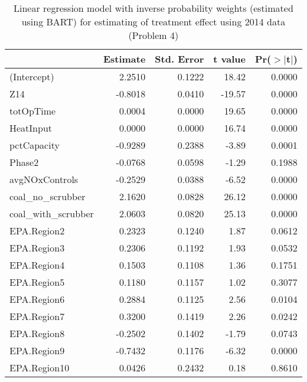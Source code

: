 \begin{table}[ht]
\centering
\begin{tabular}{lrrrr}
  \toprule
 & Estimate & Std. Error & t value & Pr($>$$|$t$|$) \\ 
  \midrule
(Intercept) & 2.2510 & 0.1222 & 18.42 & 0.0000 \\ 
  Z14 & -0.8018 & 0.0410 & -19.57 & 0.0000 \\ 
  totOpTime & 0.0004 & 0.0000 & 19.65 & 0.0000 \\ 
  HeatInput & 0.0000 & 0.0000 & 16.74 & 0.0000 \\ 
  pctCapacity & -0.9289 & 0.2388 & -3.89 & 0.0001 \\ 
  Phase2 & -0.0768 & 0.0598 & -1.29 & 0.1988 \\ 
  avgNOxControls & -0.2529 & 0.0388 & -6.52 & 0.0000 \\ 
  coal\_no\_scrubber & 2.1620 & 0.0828 & 26.12 & 0.0000 \\ 
  coal\_with\_scrubber & 2.0603 & 0.0820 & 25.13 & 0.0000 \\ 
  EPA.Region2 & 0.2323 & 0.1240 & 1.87 & 0.0612 \\ 
  EPA.Region3 & 0.2306 & 0.1192 & 1.93 & 0.0532 \\ 
  EPA.Region4 & 0.1503 & 0.1108 & 1.36 & 0.1751 \\ 
  EPA.Region5 & 0.1180 & 0.1157 & 1.02 & 0.3077 \\ 
  EPA.Region6 & 0.2884 & 0.1125 & 2.56 & 0.0104 \\ 
  EPA.Region7 & 0.3200 & 0.1419 & 2.26 & 0.0242 \\ 
  EPA.Region8 & -0.2502 & 0.1402 & -1.79 & 0.0743 \\ 
  EPA.Region9 & -0.7432 & 0.1176 & -6.32 & 0.0000 \\ 
  EPA.Region10 & 0.0426 & 0.2432 & 0.18 & 0.8610 \\ 
   \bottomrule
\end{tabular}
\caption{Linear regression model with inverse probability weights (estimated using BART) for estimating of treatment effect using 2014 data (Problem 4)} 
\label{tab:lm-2g-14}
\end{table}

